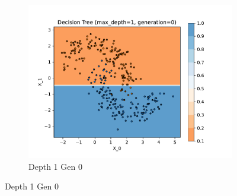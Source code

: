 \documentclass[acmconf,nonacm=true]{acmart}
\begin{document}
\begin{enumerate}
\begin{enumerate}
\begin{figure}[H]
\begin{subfigure}[b]{0.5\textwidth}
                \includegraphics[width=\textwidth]{dt_depth_1_gen_0.pdf}
                \caption{Depth 1 Gen 0}
                \label{fig:dt_depth_1_gen_0}
            \end{subfigure}
            \label{fig:1.1_row_1}
        \end{figure}


\end{enumerate}
\end{enumerate}
\end{document}
